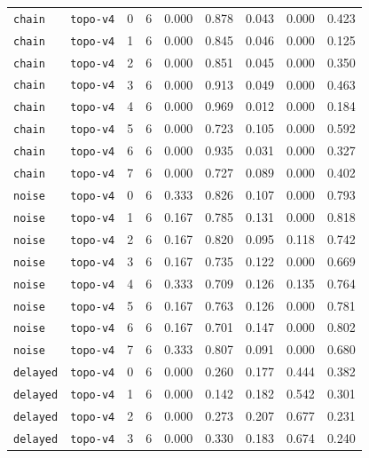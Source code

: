 \documentclass{article}
\begin{document}
\begin{center}
\begin{tabular}{lllcccccc}
\texttt{chain} & \texttt{topo-v4} & 0 & 6 & 0.000 & 0.878 & 0.043 & 0.000 & 0.423 \\
\texttt{chain} & \texttt{topo-v4} & 1 & 6 & 0.000 & 0.845 & 0.046 & 0.000 & 0.125 \\
\texttt{chain} & \texttt{topo-v4} & 2 & 6 & 0.000 & 0.851 & 0.045 & 0.000 & 0.350 \\
\texttt{chain} & \texttt{topo-v4} & 3 & 6 & 0.000 & 0.913 & 0.049 & 0.000 & 0.463 \\
\texttt{chain} & \texttt{topo-v4} & 4 & 6 & 0.000 & 0.969 & 0.012 & 0.000 & 0.184 \\
\texttt{chain} & \texttt{topo-v4} & 5 & 6 & 0.000 & 0.723 & 0.105 & 0.000 & 0.592 \\
\texttt{chain} & \texttt{topo-v4} & 6 & 6 & 0.000 & 0.935 & 0.031 & 0.000 & 0.327 \\
\texttt{chain} & \texttt{topo-v4} & 7 & 6 & 0.000 & 0.727 & 0.089 & 0.000 & 0.402 \\
\texttt{noise} & \texttt{topo-v4} & 0 & 6 & 0.333 & 0.826 & 0.107 & 0.000 & 0.793 \\
\texttt{noise} & \texttt{topo-v4} & 1 & 6 & 0.167 & 0.785 & 0.131 & 0.000 & 0.818 \\
\texttt{noise} & \texttt{topo-v4} & 2 & 6 & 0.167 & 0.820 & 0.095 & 0.118 & 0.742 \\
\texttt{noise} & \texttt{topo-v4} & 3 & 6 & 0.167 & 0.735 & 0.122 & 0.000 & 0.669 \\
\texttt{noise} & \texttt{topo-v4} & 4 & 6 & 0.333 & 0.709 & 0.126 & 0.135 & 0.764 \\
\texttt{noise} & \texttt{topo-v4} & 5 & 6 & 0.167 & 0.763 & 0.126 & 0.000 & 0.781 \\
\texttt{noise} & \texttt{topo-v4} & 6 & 6 & 0.167 & 0.701 & 0.147 & 0.000 & 0.802 \\
\texttt{noise} & \texttt{topo-v4} & 7 & 6 & 0.333 & 0.807 & 0.091 & 0.000 & 0.680 \\
\texttt{delayed} & \texttt{topo-v4} & 0 & 6 & 0.000 & 0.260 & 0.177 & 0.444 & 0.382 \\
\texttt{delayed} & \texttt{topo-v4} & 1 & 6 & 0.000 & 0.142 & 0.182 & 0.542 & 0.301 \\
\texttt{delayed} & \texttt{topo-v4} & 2 & 6 & 0.000 & 0.273 & 0.207 & 0.677 & 0.231 \\
\texttt{delayed} & \texttt{topo-v4} & 3 & 6 & 0.000 & 0.330 & 0.183 & 0.674 & 0.240 \\
\bottomrule
\end{tabular}
\end{center}
\end{document}
